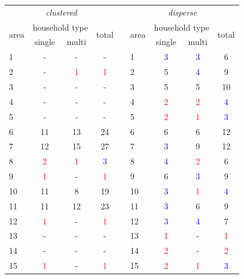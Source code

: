 \begin{table}[H]
    \centering
    \begin{tabular}{|l|cc|c|  c  |l|cc|c|}
        \multicolumn{4}{c}{\emph{clustered}} & \multicolumn{1}{c}{} & \multicolumn{4}{c}{\emph{disperse}}\\[7pt]
        \cline{1-4} \cline{6-9}
        \multirow{2}{*}{area} & \multicolumn{2}{c|}{household type} & \multirow{2}{*}{total} & &
        \multirow{2}{*}{area} & \multicolumn{2}{c|}{household type} & \multirow{2}{*}{total}\\[5pt]
         & single & multi & & & & single & multi & \\
        \cline{1-4} \cline{6-9}
        1  & -  & -  & -  &  & 1  & \textcolor{blue}{3} & \textcolor{blue}{3} & 6  \\
        2  & -  & \textcolor{red}{1}  & \textcolor{red}{1}  &  & 2  & 5 & \textcolor{blue}{4} & 9  \\
        3  & -  & -  & -  &  & 3  & 5 & 5 & 10 \\
        4  & -  & -  & -  &  & 4  & \textcolor{red}{2} & \textcolor{red}{2} & \textcolor{blue}{4}  \\
        5  & -  & -  & -  &  & 5  & \textcolor{red}{2} & \textcolor{red}{1} & \textcolor{blue}{3}  \\
        6  & 11 & 13 & 24 &  & 6  & 6 & 6 & 12 \\
        7  & 12 & 15 & 27 &  & 7  & \textcolor{blue}{3} & 9 & 12 \\
        8  & \textcolor{red}{2}  & \textcolor{red}{1}  & \textcolor{blue}{3}  &  & 8  & \textcolor{blue}{4} & \textcolor{red}{2} & 6  \\
        9  & \textcolor{red}{1}  & -  & \textcolor{red}{1}  &  & 9  & 6 & \textcolor{blue}{3} & 9  \\
        10 & 11 & 8  & 19 &  & 10 & \textcolor{blue}{3} & \textcolor{red}{1} & \textcolor{blue}{4}  \\
        11 & 11 & 12 & 23 &  & 11 & \textcolor{blue}{3} & 6 & 9  \\
        12 & \textcolor{red}{1}  & -  & \textcolor{red}{1}  &  & 12 & \textcolor{blue}{3} & \textcolor{blue}{4} & 7  \\
        13 & -  & -  & -  &  & 13 & \textcolor{red}{1} & - & \textcolor{red}{1}  \\
        14 & -  & -  & -  &  & 14 & \textcolor{red}{2} & - & \textcolor{red}{2}  \\
        15 & \textcolor{red}{1}  & -  & \textcolor{red}{1}  &  & 15 & \textcolor{red}{2} & \textcolor{red}{1} & \textcolor{blue}{3}  \\

\end{tabular}
\end{table}

